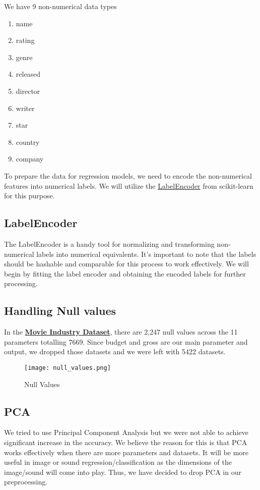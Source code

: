 \documentclass[conference]{IEEEtran}
\begin{document}
        We have 9 non-numerical data types
        \begin{enumerate}
            \item name
            \item rating
            \item genre
            \item released
            \item director
            \item writer
            \item star
            \item country
            \item company
        \end{enumerate}

        To prepare the data for regression models, we need to encode the non-numerical features into numerical labels. We will utilize the \href{https://scikit-learn.org/stable/modules/generated/sklearn.preprocessing.LabelEncoder.html}{LabelEncoder} from scikit-learn for this purpose.

        \subsection*{LabelEncoder}
            The LabelEncoder is a handy tool for normalizing and transforming non-numerical labels into numerical equivalents. It's important to note that the labels should be hashable and comparable for this process to work effectively. We will begin by fitting the label encoder and obtaining the encoded labels for further processing.

        \subsection*{Handling Null values}
            In the \href{https://www.kaggle.com/datasets/danielgrijalvas/movies}{\textbf{Movie Industry Dataset}}, there are 2,247 null values across the 11 parameters totalling 7669.
            Since budget and gross are our main parameter and output, we dropped those datasets and we were left with 5422 datasets.

            \begin{figure}
                \centering \texttt{[image: null\_values.png]}
                \caption{Null Values}
                \label{fig:null-values}
            \end{figure}

        \subsection*{PCA}
            We tried to use Principal Component Analysis but we were not able to achieve significant increase in the accuracy.
            We believe the reason for this is that PCA works effectively when there are more parameters and datasets.
            It will be more useful in image or sound regression/classification as the dimensions of the image/sound will come into play.
            Thus, we have decided to drop PCA in our preprocessing.
\end{document}
